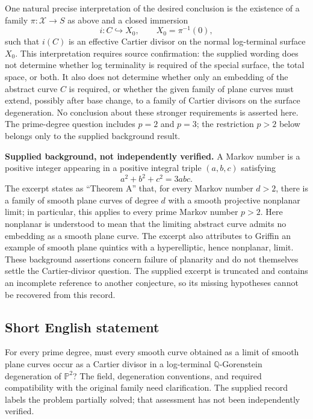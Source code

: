 \documentclass[11pt]{article}
\newcommand{\Q}{\mathbb{Q}}
\newcommand{\PP}{\mathbb{P}}
\begin{document}
One natural precise interpretation of the desired conclusion is the existence of a family \(\pi\colon\mathcal X\to S\) as above and a closed immersion
\[
 i\colon C\hookrightarrow X_0,\qquad X_0=\pi^{-1}(0),
\]
such that \(i(C)\) is an effective Cartier divisor on the normal log-terminal surface \(X_0\). This interpretation requires source confirmation: the supplied wording does not determine whether log terminality is required of the special surface, the total space, or both. It also does not determine whether only an embedding of the abstract curve \(C\) is required, or whether the given family of plane curves must extend, possibly after base change, to a family of Cartier divisors on the surface degeneration. No conclusion about these stronger requirements is asserted here. The prime-degree question includes \(p=2\) and \(p=3\); the restriction \(p>2\) below belongs only to the supplied background result.

\textbf{Supplied background, not independently verified.} A Markov number is a positive integer appearing in a positive integral triple \((a,b,c)\) satisfying
\[
 a^2+b^2+c^2=3abc.
\]
The excerpt states as ``Theorem A'' that, for every Markov number \(d>2\), there is a family of smooth plane curves of degree \(d\) with a smooth projective nonplanar limit; in particular, this applies to every prime Markov number \(p>2\). Here nonplanar is understood to mean that the limiting abstract curve admits no embedding as a smooth plane curve. The excerpt also attributes to Griffin an example of smooth plane quintics with a hyperelliptic, hence nonplanar, limit. These background assertions concern failure of planarity and do not themselves settle the Cartier-divisor question. The supplied excerpt is truncated and contains an incomplete reference to another conjecture, so its missing hypotheses cannot be recovered from this record.
\subsection{Short English statement}
For every prime degree, must every smooth curve obtained as a limit of smooth plane curves occur as a Cartier divisor in a log-terminal \(\Q\)-Gorenstein degeneration of \(\PP^2\)? The field, degeneration conventions, and required compatibility with the original family need clarification. The supplied record labels the problem partially solved; that assessment has not been independently verified.
\end{document}

